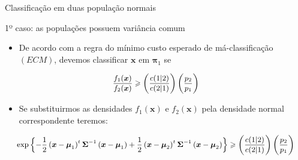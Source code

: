\documentclass[
  ignorenonframetext,
  aspectratio=169,
]{beamer}
\providecommand{\tightlist}{%
  \setlength{\itemsep}{0pt}\setlength{\parskip}{0pt}}
\begin{document}
\begin{frame}{Classificação em duas população normais}
\label{classificauxe7uxe3o-em-duas-populauxe7uxe3o-normais-1}
\begin{block}{1º caso: as populações possuem variância comum}
\label{uxba-caso-as-populauxe7uxf5es-possuem-variuxe2ncia-comum-1}
\begin{itemize}
\tightlist
\item
  De acordo com a regra do mínimo custo esperado de má-classificação
  \((ECM)\), devemos classificar \(\boldsymbol{x}\) em
  \(\boldsymbol{\pi}_1\) se
\end{itemize}

\[\small \dfrac{f_1(\boldsymbol{x})}{f_2(\boldsymbol{x})} \geqslant \left( \dfrac{c(1|2)}{c(2|1)}\right) \left( \dfrac{p_2}{p_1}\right)\]

\begin{itemize}
\tightlist
\item
  Se substituirmos as densidades \(f_1(\boldsymbol{x})\) e
  \(f_2 (\boldsymbol{x})\) pela densidade normal correspondente teremos:
\end{itemize}

\[\small \exp\left\lbrace -\dfrac{1}{2} \left( \boldsymbol{x} - \boldsymbol{\mu}_1\right) ^t \boldsymbol{\Sigma}^{-1} \left( \boldsymbol{x} - \boldsymbol{\mu}_1\right) + \dfrac{1}{2} \left( \boldsymbol{x} - \boldsymbol{\mu}_2\right) ^t \boldsymbol{\Sigma}^{-1} \left( \boldsymbol{x} - \boldsymbol{\mu}_2\right)\right\rbrace \geqslant \left( \dfrac{c(1|2)}{c(2|1)}\right) \left( \dfrac{p_2}{p_1}\right)\]
\end{block}
\end{frame}
\end{document}

